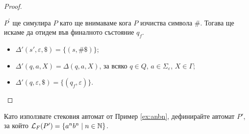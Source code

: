 \begin{proof}
\begin{enumerate}[1)]
    $P^\prime$ ще симулира $P$ като ще внимаваме кога $P$ изчиства символа $\#$. Тогава ще искаме да отидем във финалното състояние $q_f$.
    \begin{itemize}
    \item 
      $\Delta'(s',\varepsilon,\$) = \{(s, \#\$)\}$;
    \item
      $\Delta'(q,a,X) = \Delta(q,a,X)$, за всяко $q \in Q$, $a \in \Sigma_\varepsilon$, $X \in \Gamma$;
    \item
      $\Delta'(q,\varepsilon,\$) = \{(q_f,\varepsilon)\}$.
    \end{itemize}
  \end{enumerate}
\end{proof}

\begin{problem}
  Като използвате стековия автомат от Пример \ref{ex:anbn}, дефинирайте автомат $P'$, за който
  $\mathcal{L}_F(P') = \{a^nb^n \mid n\in\mathbb{N}\}$.
\end{problem}

